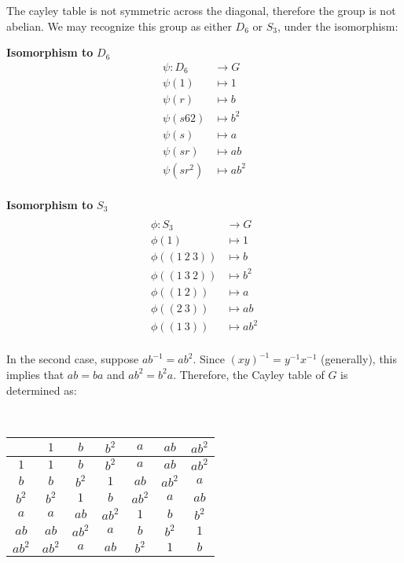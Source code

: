 The cayley table is not symmetric across the diagonal, therefore
the group is not abelian.
We may recognize this group as either $D_6$ or $S_3$,
under the isomorphism:
\newpage
\begin{multicols}{2}
  \textbf{Isomorphism to} $D_6$
  \begin{align*}
    \psi \colon D_6 &\to G \\
    \psi(1) &\mapsto 1 \\
    \psi(r) &\mapsto b \\
    \psi(s62) &\mapsto b^2 \\
    \psi(s) &\mapsto a \\
    \psi(sr) &\mapsto ab \\
    \psi(sr^2) &\mapsto ab^2 \\
  \end{align*}
  \columnbreak

  \textbf{Isomorphism to} $S_3$
  \begin{align*} \\
    \phi \colon S_3 &\to G \\
    \phi(1) &\mapsto 1 \\
    \phi((1\ 2\ 3)) &\mapsto b \\
    \phi((1\ 3\ 2)) &\mapsto b^2 \\
    \phi((1\ 2)) &\mapsto a \\
    \phi((2\ 3)) &\mapsto ab \\
    \phi((1\ 3)) &\mapsto ab^2 \\
  \end{align*}
\end{multicols}
In the second case, suppose ${ab}^{-1} = ab^2$.
Since ${(xy)}^{-1} = y^{-1}x^{-1}$ (generally), this implies that
$ab = ba$ and $ab^2 = b^2a$.
Therefore, the Cayley table of $G$ is determined as:

\begin{center}
  \begin{table}[H]~\label{tab:cayley-table-order-6=b}
    \begin{tabular}{|c|c|c|c|c|c|c|}
      \hline
      & $1$ & $b$ & $b^2$ & $a$ & $ab$ & $ab^2$ \\
      \midrule
      $1$ & $1$ & $b$ & $b^2$ & $a$ & $ab$ & $ab^2$ \\
      $b$ & $b$ & $b^2$ & $1$ & $ab$ & $ab^2$ & $a$ \\
      $b^2$ & $b^2$ & $1$ & $b$ & $ab^2$ & $a$ & $ab$ \\
      $a$ & $a$ & $ab$ & $ab^2$ & $1$ & $b$ & $b^2$ \\
      $ab$ & $ab$ & $ab^2$ & $a$ & $b$ & $b^2$ & $1$ \\
      $ab^2$ & $ab^2$ & $a$ & $ab$ & $b^2$ & $1$ & $b$ \\
      \bottomrule
    \end{tabular}
  \end{table}
\end{center}


